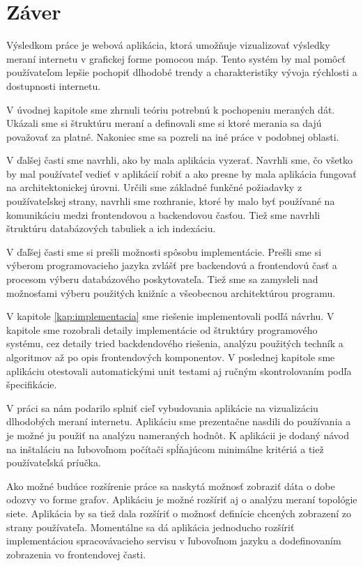 \chapter*{Záver}  %

Výsledkom práce je webová aplikácia, ktorá umožňuje vizualizovať 
výsledky meraní internetu v grafickej forme pomocou máp. Tento systém 
by mal pomôcť používateľom lepšie pochopiť dlhodobé trendy a charakteristiky 
vývoja rýchlosti a dostupnosti internetu.

V úvodnej kapitole sme zhrnuli teóriu potrebnú k pochopeniu meraných dát. 
Ukázali sme si štruktúru meraní a definovali sme si ktoré merania sa dajú
považovať za platné. Nakoniec sme sa pozreli na iné práce v podobnej oblasti.

V ďalšej časti sme navrhli, ako by mala aplikácia vyzerať. Navrhli sme, čo 
všetko by mal používateľ vedieť v aplikácií robiť a ako presne by mala 
aplikácia fungovať na architektonickej úrovni. Určili sme základné funkčné
požiadavky z používateľskej strany, navrhli sme rozhranie, ktoré by malo 
byť používané na komunikáciu medzi frontendovou a backendovou časťou.
Tiež sme navrhli štruktúru databázových tabuliek a ich indexáciu.

V ďaľšej časti sme si prešli možnosti spôsobu implementácie. Prešli sme 
si výberom programovacieho jazyka zvlášť pre backendovú a frontendovú časť a 
procesom výberu databázového poskytovateľa.
Tiež sme sa zamysleli nad možnosťami výberu použitých knižníc a všeobecnou 
architektúrou programu.

V kapitole \ref{kap:implementacia} sme riešenie implementovali podľá návrhu. 
V kapitole sme rozobrali detaily implementácie od štruktúry programového systému,
cez detaily tried backdendového riešenia, analýzu použitých techník a algoritmov 
až po opis frontendových komponentov. V poslednej kapitole sme aplikáciu otestovali 
automatickými unit testami aj ručným skontrolovaním podľa špecifikácie.

V práci sa nám podarilo splniť cieľ vybudovania aplikácie na vizualizáciu dlhodobých 
meraní internetu. Aplikáciu sme prezentačne nasdili do používania a je možné ju použiť na analýzu 
nameraných hodnôt. K aplikácii je dodaný návod na inštaláciu na ľubovoľnom počítači spĺňajúcom minimálne kritériá 
a tiež používateľská príučka. 

Ako možné budúce rozšírenie práce sa naskytá možnosť zobraziť dáta o dobe odozvy vo forme grafov.
Aplikáciu je možné rozšíriť aj o analýzu meraní topológie siete. Aplikácia by sa tiež dala rozšíriť 
o možnosť definície chcených zobrazení zo strany používateľa. Momentálne sa dá aplikácia jednoducho rozšíriť 
implementáciou spracovávacieho servisu v ľubovoľnom jazyku a dodefinovaním zobrazenia vo frontendovej časti.
